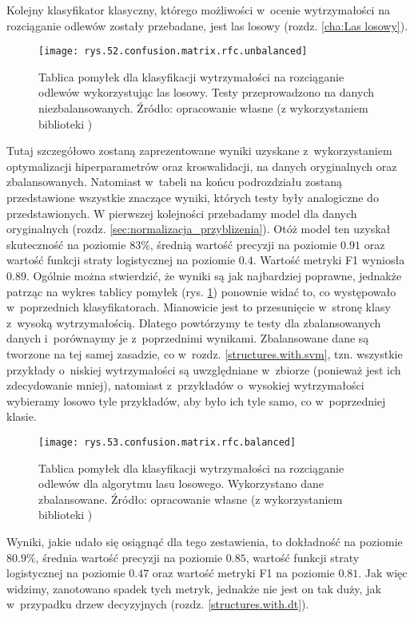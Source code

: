 Kolejny klasyfikator klasyczny, którego możliwości w~ocenie wytrzymałości na rozciąganie odlewów zostały przebadane, jest las losowy (rozdz. \ref{cha:Las losowy}). 
\begin{figure}[!h]
    \centering
    \texttt{[image: rys.52.confusion.matrix.rfc.unbalanced]}
    \caption{Tablica pomyłek dla klasyfikacji wytrzymałości na rozciąganie odlewów wykorzystując las losowy. Testy przeprowadzono na danych niezbalansowanych. Źródło: opracowanie własne (z wykorzystaniem biblioteki )}
    \label{rys.52.confusion.matrix.rfc.unbalanced}
\end{figure}
Tutaj szczegółowo zostaną zaprezentowane wyniki uzyskane z~wykorzystaniem optymalizacji hiperparametrów oraz kroswalidacji, na danych oryginalnych oraz zbalansowanych. Natomiast w~tabeli na końcu podrozdziału zostaną przedstawione wszystkie znaczące wyniki, których testy były analogiczne do przedstawionych. 
W pierwszej kolejności przebadamy model dla danych oryginalnych (rozdz. \ref{sec:normalizacja_przyblizenia}). Otóż model ten uzyskał skuteczność na poziomie $83\%$, średnią wartość precyzji na poziomie $0.91$ oraz wartość funkcji straty logistycznej na poziomie $0.4$. Wartość metryki F1 wyniosła $0.89$. Ogólnie można stwierdzić, że wyniki są jak najbardziej poprawne, jednakże patrząc na wykres tablicy pomyłek (rys. \ref{rys.52.confusion.matrix.rfc.unbalanced}) ponownie widać to, co występowało w~poprzednich klasyfikatorach. Mianowicie jest to przesunięcie w~stronę klasy z~wysoką wytrzymałością. Dlatego powtórzymy te testy dla zbalansowanych danych i~porównaymy je z~poprzednimi wynikami. 
Zbalansowane dane są tworzone na tej samej zasadzie, co w~rozdz. \ref{structures.with.svm}, tzn. wszystkie przykłady o~niskiej wytrzymałości są uwzględniane w~zbiorze (ponieważ jest ich zdecydowanie mniej), natomiast z~przykładów o~wysokiej wytrzymałości wybieramy losowo tyle przykładów, aby było ich tyle samo, co w~poprzedniej klasie. 
\begin{figure}[h]
    \centering
    \texttt{[image: rys.53.confusion.matrix.rfc.balanced]}
    \caption{Tablica pomyłek dla klasyfikacji wytrzymałości na rozciąganie odlewów dla algorytmu lasu losowego. Wykorzystano dane zbalansowane. Źródło: opracowanie własne (z wykorzystaniem biblioteki )}
    \label{rys.53.confusion.matrix.rfc.balanced}
\end{figure}
Wyniki, jakie udało się osiągnąć dla tego zestawienia, to dokładność na poziomie $80.9\%$, średnia wartość precyzji na poziomie $0.85$, wartość funkcji straty logistycznej na poziomie $0.47$ oraz wartość metryki F1 na poziomie $0.81$. Jak więc widzimy, zanotowano spadek tych metryk, jednakże nie jest on tak duży, jak w~przypadku drzew decyzyjnych (rozdz. \ref{structures.with.dt}). 
